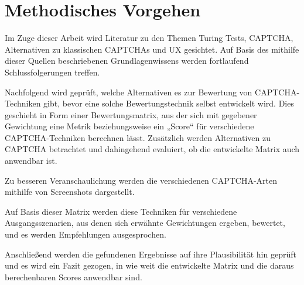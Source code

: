 \chapter{Methodisches Vorgehen}
Im Zuge dieser Arbeit wird Literatur zu den Themen Turing Tests, CAPTCHA, Alternativen zu klassischen CAPTCHAs und UX gesichtet.
Auf Basis des mithilfe dieser Quellen beschriebenen Grundlagenwissens werden fortlaufend Schlussfolgerungen treffen. 

Nachfolgend wird geprüft, welche Alternativen es zur Bewertung von CAPTCHA-Techniken gibt, bevor eine solche Bewertungstechnik selbst entwickelt wird. 
Dies geschieht in Form einer Bewertungsmatrix, aus der sich mit gegebener Gewichtung eine Metrik beziehungsweise ein „Score“ für verschiedene CAPTCHA-Techniken berechnen lässt. 
Zusätzlich werden Alternativen zu CAPTCHA betrachtet und dahingehend evaluiert, ob die entwickelte Matrix auch anwendbar ist.

Zu besseren Veranschaulichung werden die verschiedenen CAPTCHA-Arten mithilfe von Screenshots dargestellt.

Auf Basis dieser Matrix werden diese Techniken für verschiedene Ausgangsszenarien, 
aus denen sich erwähnte Gewichtungen ergeben, bewertet, und es werden Empfehlungen ausgesprochen.

Anschließend werden die gefundenen Ergebnisse auf ihre Plausibilität hin geprüft und es wird ein Fazit gezogen, 
in wie weit die entwickelte Matrix und die daraus berechenbaren Scores anwendbar sind.
  
